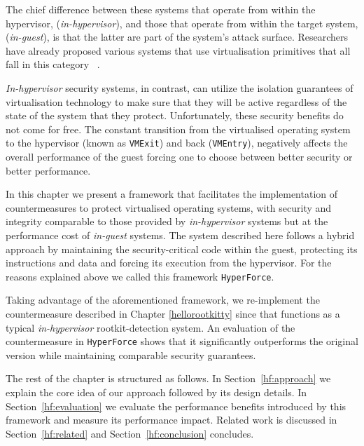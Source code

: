 The chief difference between these systems that operate from within the hypervisor, (\textit{in-hypervisor}), and those that operate from within the target system, (\textit{in-guest}), is that the latter are part of the system's attack surface. Researchers have already proposed various systems that use virtualisation primitives that all fall in this category ~\cite{Criswell2007, Dewant2008, copilot, NICKLE, qubesos}.

\textit{In-hypervisor} security systems, in contrast, can utilize the isolation guarantees of virtualisation technology to make sure that they will be active regardless of the state of the system that they protect. 
Unfortunately, these security benefits do not come for free. The constant transition from the virtualised operating system to the hypervisor (known as \texttt{VMExit}) and back (\texttt{VMEntry}), negatively affects the overall performance of the guest forcing one to choose between better security or better performance.

In this chapter we present a framework that facilitates the implementation of countermeasures to protect virtualised operating systems, with security and integrity comparable to those provided by \textit{in-hypervisor} systems but at the performance cost of \textit{in-guest} systems. The system described here follows a hybrid approach by maintaining the security-critical code within the guest, protecting its instructions and data and forcing its execution from the hypervisor. For the reasons explained above we called this framework \texttt{HyperForce}.

Taking advantage of the aforementioned framework, we re-implement the countermeasure described in Chapter \ref{hellorootkitty} since that functions as a typical \textit{in-hypervisor} rootkit-detection system. An evaluation of the countermeasure in \texttt{HyperForce} shows that it significantly outperforms the original version while maintaining comparable security guarantees.

The rest of the chapter is structured as follows. In Section~\ref{hf:approach} we explain the core idea of our approach followed by its design details. In Section~\ref{hf:evaluation} we evaluate the performance benefits introduced by this framework and measure its performance impact. Related work is discussed in Section~\ref{hf:related} and Section~\ref{hf:conclusion} concludes.

